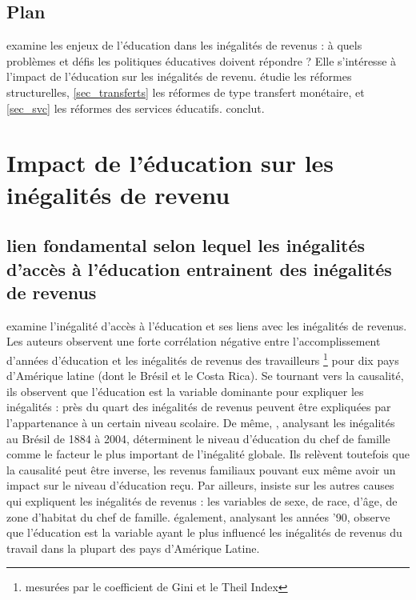 \documentclass[pagesize, twoside=off, bibliography=totoc, DIV=calc, fontsize=12pt, a4paper, french]{scrartcl}
\begin{document}
\subsection{Plan}

 examine les enjeux de l’éducation dans les inégalités de revenus : à quels problèmes et défis les politiques éducatives doivent répondre ? Elle s’intéresse à l’impact de l’éducation sur les inégalités de revenu.  étudie les réformes structurelles, \cref{sec_transferts} les réformes de type transfert monétaire, et \cref{sec_svc} les réformes des services éducatifs.  conclut.

\section{Impact de l’éducation sur les inégalités de revenu}

\label{sec_educ}

\subsection{lien fondamental selon lequel les inégalités d’accès à l’éducation entrainent des inégalités de revenus}

\citet{psacharopoulos_poverty_1995} examine l’inégalité d’accès à l’éducation et ses liens avec les inégalités de revenus. Les auteurs observent une forte corrélation négative entre l’accomplissement d’années d’éducation et les inégalités de revenus des travailleurs \footnote{mesurées par le coefficient de Gini et le Theil Index} pour dix pays d’Amérique latine (dont le Brésil et le Costa Rica). Se tournant vers la causalité, ils observent que l’éducation est la variable dominante pour expliquer les inégalités : près du quart des inégalités de revenus peuvent être expliquées par l’appartenance à un certain niveau scolaire. De même, \citet{ferreira_rise_2008}, analysant les inégalités au Brésil de 1884 à 2004, déterminent le niveau d’éducation du chef de famille comme le facteur le plus important de l’inégalité globale. Ils relèvent toutefois que la causalité peut être inverse, les revenus familiaux pouvant eux même avoir un impact sur le niveau d'éducation reçu. Par ailleurs, \citet{ferreira_rise_2008} insiste sur les autres causes qui expliquent les inégalités de revenus : les variables de sexe, de race, d’âge, de zone d’habitat du chef de famille.  également, analysant les années ’90, observe que l’éducation est la variable ayant le plus influencé les inégalités de revenus du travail dans la plupart des pays d’Amérique Latine.
\end{document}
